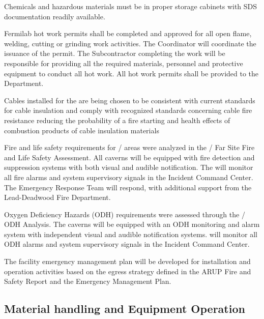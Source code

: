 Chemicals and hazardous materials must be in proper storage cabinets
with SDS documentation readily available.

Fermilab hot work permits shall be completed and approved for all open
flame, welding, cutting or grinding work activities.  The 
 Coordinator will coordinate the issuance of the permit.
The Subcontractor completing the work will be responsible for
providing all the required materials, personnel and protective
equipment to conduct all hot work. All hot work permits shall be
provided to the   Department.

Cables installed for the  are being chosen to be
consistent with current \fnal standards for cable insulation and
comply with recognized standards concerning cable fire resistance
reducing the probability of a fire starting and health effects of
combustion products of cable insulation materials

Fire and life safety requirements for / areas
were analyzed in the / Far Site Fire and Life
Safety Assessment. All caverns will be equipped with fire detection
and suppression systems with both visual and audible notification. The
 will monitor all fire alarms and system supervisory signals in
the  Incident Command Center.  The  Emergency Response Team
will respond, with additional support from the Lead-Deadwood Fire
Department.

Oxygen Deficiency Hazards (ODH) requirements were assessed through the
/ ODH Analysis. The caverns will be equipped
with an ODH monitoring and alarm system with independent visual and
audible notification systems.  will monitor all ODH alarms and
system supervisory signals in the  Incident Command Center.

The facility emergency management plan will be developed for
installation and operation activities based on the egress strategy
defined in the ARUP Fire and Safety Report and the  Emergency
Management Plan.

\subsection{Material handling and Equipment Operation}

